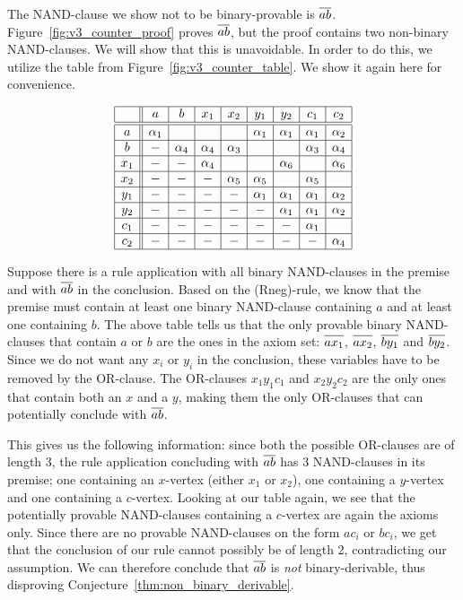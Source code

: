 The NAND-clause we show not to be binary-provable is $\ol{ab}$.
Figure~\ref{fig:v3_counter_proof} proves $\ol{ab}$, but the proof contains two non-binary NAND-clauses.
We will show that this is unavoidable.
In order to do this, we utilize the table from Figure~\ref{fig:v3_counter_table}.
We show it again here for convenience.\par
\begin{figure}[!h]
  \centering
  \[\begin{array}{|c||c|c|c|c|c|c|c|c|}
    \hline
    & a & b & x_1 & x_2 & y_1 & y_2 & c_1 & c_2 \\ \hline\hline
    a & \alpha_1 & & & & \alpha_1 & \alpha_1 & \alpha_1 & \alpha_2 \\ \hline
    b &-& \alpha_4 & \alpha_4 & \alpha_3 & & & \alpha_3 & \alpha_4 \\ \hline
    x_1 &-&-& \alpha_4 & & & \alpha_6 & & \alpha_6 \\ \hline
    x_2 &-&-&-& \alpha_5 & \alpha_5 & & \alpha_5 & \\ \hline
    y_1 &-&-&-&-& \alpha_1 & \alpha_1 & \alpha_1 & \alpha_2 \\ \hline
    y_2 &-&-&-&-&-& \alpha_1 & \alpha_1 & \alpha_2 \\ \hline
    c_1 &-&-&-&-&-&-& \alpha_1 & \\ \hline
    c_2 &-&-&-&-&-&-&-& \alpha_4 \\ \hline
  \end{array}\]
  \caption{}
  \label{fig:open_door_table}
\end{figure}

Suppose there is a rule application with all binary NAND-clauses in the premise and with $\ol{ab}$ in the conclusion.
Based on the (Rneg)-rule, we know that the premise must contain at least one binary NAND-clause containing $a$ and at least one containing $b$.
The above table tells us that the only provable binary NAND-clauses that contain $a$ or $b$ are the ones in the axiom set:
$\ol{ax_1}$, $\ol{ax_2}$, $\ol{by_1}$ and $\ol{by_2}$.
Since we do not want any $x_i$ or $y_i$ in the conclusion, these variables have to be removed by the OR-clause.
The OR-clauses $x_1y_1c_1$ and $x_2y_2c_2$ are the only ones that contain both an $x$ and a $y$, making them the only OR-clauses that can potentially conclude with $\ol{ab}$.

This gives us the following information: since both the possible OR-clauses are of length 3, the rule application concluding with $\ol{ab}$ has 3 NAND-clauses in its premise; one containing an $x$-vertex (either $x_1$ or $x_2$), one containing a $y$-vertex and one containing a $c$-vertex.
Looking at our table again, we see that the potentially provable NAND-clauses containing a $c$-vertex are again the axioms only.
Since there are no provable NAND-clauses on the form $ac_i$ or $bc_i$, we get that the conclusion of our rule cannot possibly be of length 2, contradicting our assumption.
We can therefore conclude that $\ol{ab}$ is \textit{not} binary-derivable, thus disproving Conjecture~\ref{thm:non_binary_derivable}.
